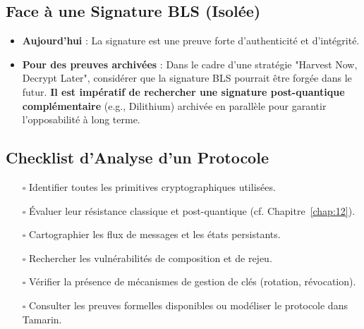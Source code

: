 \subsection{Face à une Signature BLS (Isolée)}
\label{subsec:19.3.2}
\begin{itemize}
    \item \textbf{Aujourd'hui} : La signature est une preuve forte d'authenticité et d'intégrité.
    \item \textbf{Pour des preuves archivées} : Dans le cadre d'une stratégie "Harvest Now, Decrypt Later", considérer que la signature BLS pourrait être forgée dans le futur. \textbf{Il est impératif de rechercher une signature post-quantique complémentaire} (e.g., Dilithium) archivée en parallèle pour garantir l'opposabilité à long terme.
\end{itemize}

\subsection{Checklist d'Analyse d'un Protocole}
\label{subsec:19.3.3}
\begin{enumerate}
    \item[$\square$] Identifier toutes les primitives cryptographiques utilisées.
    \item[$\square$] Évaluer leur résistance classique et post-quantique (cf. Chapitre~\ref{chap:12}).
    \item[$\square$] Cartographier les flux de messages et les états persistants.
    \item[$\square$] Rechercher les vulnérabilités de composition et de rejeu.
    \item[$\square$] Vérifier la présence de mécanismes de gestion de clés (rotation, révocation).
    \item[$\square$] Consulter les preuves formelles disponibles ou modéliser le protocole dans Tamarin.
\end{enumerate}
